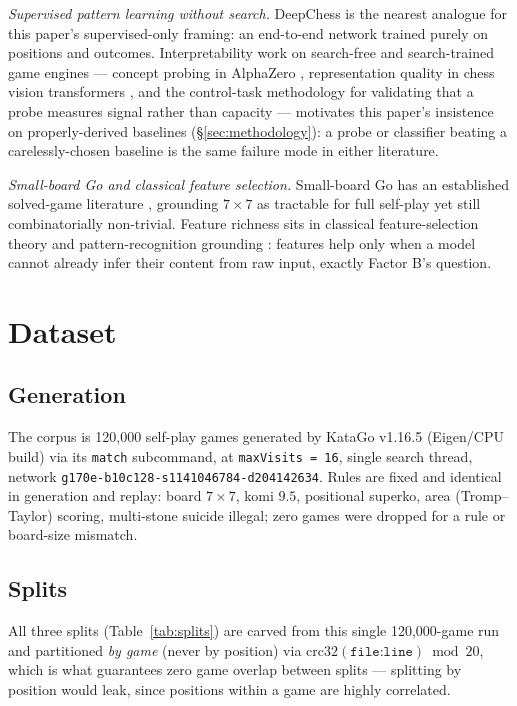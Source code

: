 \documentclass[conference,a4paper]{IEEEtran}
\begin{document}
\textit{Supervised pattern learning without search.} DeepChess
\cite{david2016deepchess} is the nearest analogue for this paper's
supervised-only framing: an end-to-end network trained purely on positions
and outcomes. Interpretability work on search-free and search-trained game
engines --- concept probing in AlphaZero \cite{mcgrath2022acquisition},
representation quality in chess vision transformers
\cite{czech2023representation}, and the control-task methodology for
validating that a probe measures signal rather than capacity
\cite{hewitt2019designing} --- motivates this paper's insistence on
properly-derived baselines (\S\ref{sec:methodology}): a probe or classifier
beating a carelessly-chosen baseline is the same failure mode in either
literature.

\textit{Small-board Go and classical feature selection.} Small-board Go has
an established solved-game literature \cite{vanderwerf2003solving},
grounding $7{\times}7$ as tractable for full self-play yet still
combinatorially non-trivial. Feature richness sits in classical
feature-selection theory \cite{guyon2003introduction} and pattern-recognition
grounding \cite{bishop2006pattern}: features help only when a model cannot
already infer their content from raw input, exactly Factor B's question.

\section{Dataset}
\label{sec:dataset}

\subsection{Generation}
The corpus is 120{,}000 self-play games generated by KataGo v1.16.5
(Eigen/CPU build) via its \texttt{match} subcommand, at \texttt{maxVisits =
16}, single search thread, network
\texttt{g170e-b10c128-s1141046784-d204142634}. Rules are fixed and identical
in generation and replay: board $7\times7$, komi $9.5$, positional superko,
area (Tromp--Taylor) scoring, multi-stone suicide illegal; zero games were
dropped for a rule or board-size mismatch.

\subsection{Splits}
All three splits (Table~\ref{tab:splits}) are carved from this single
120{,}000-game run and partitioned \emph{by game} (never by position) via
$\mathrm{crc32}(\texttt{file:line}) \bmod 20$, which is what guarantees zero
game overlap between splits --- splitting by position would leak, since
positions within a game are highly correlated.
\end{document}
